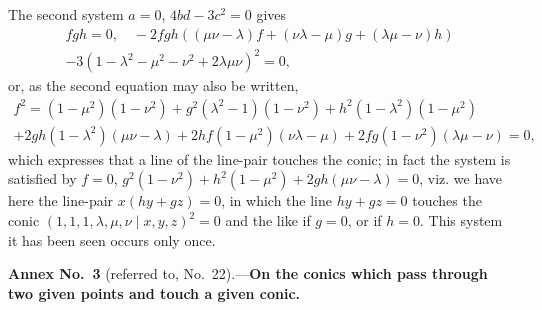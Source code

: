 \documentclass[12pt,a4paper]{article}
\begin{document}
The second system $a = 0$, $4bd - 3c^2 = 0$ gives
\begin{multline*}
fgh = 0,\quad -2fgh((\mu\nu - \lambda)f + (\nu\lambda - \mu)g + (\lambda\mu - \nu)h)\\
- 3(1 - \lambda^2 - \mu^2 - \nu^2 + 2\lambda\mu\nu)^2 = 0,
\end{multline*}
or, as the second equation may also be written,
\begin{multline*}
f^2 = (1 - \mu^2)(1 - \nu^2) + g^2(\lambda^2 - 1)(1 - \nu^2) + h^2(1 - \lambda^2)(1 - \mu^2)\\
+ 2gh(1 - \lambda^2)(\mu\nu - \lambda) + 2hf(1 - \mu^2)(\nu\lambda - \mu) + 2fg(1 - \nu^2)(\lambda\mu - \nu) = 0,
\end{multline*}
which expresses that a line of the line-pair touches the conic; in fact the system is satisfied by $f = 0$, $g^2(1 - \nu^2) + h^2(1 - \mu^2) + 2gh(\mu\nu - \lambda) = 0$, viz. we have here the line-pair $x(hy + gz) = 0$, in which the line $hy + gz = 0$ touches the conic $(1, 1, 1, \lambda, \mu, \nu \mid x, y, z)^2 = 0$ and the like if $g = 0$, or if $h = 0$. This system it has been seen occurs only once.

\bigskip
\noindent\textbf{Annex No.~3} (referred to, No.~22).---\textbf{On the conics which pass through two given points and touch a given conic.}

\smallskip
\end{document}
